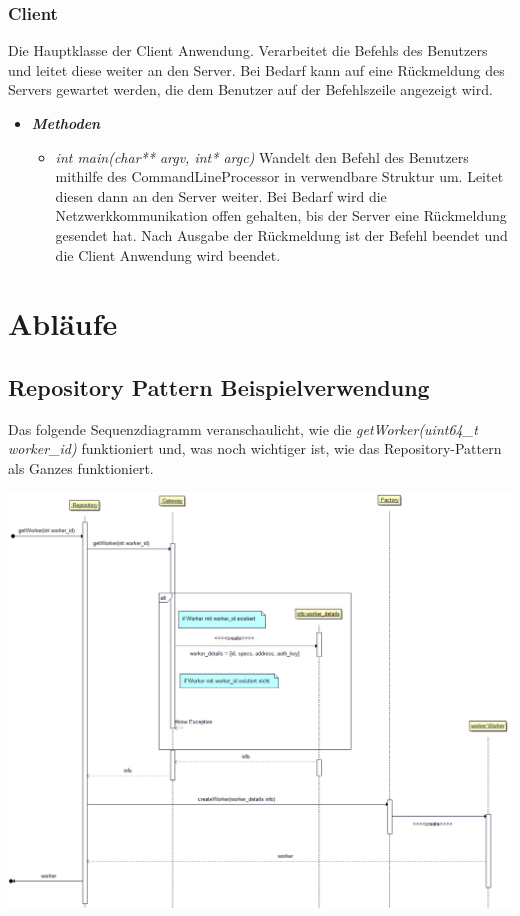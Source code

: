 \documentclass[a4paper,12pt]{article}
\begin{document}
\subsubsection{Client}

Die Hauptklasse der Client Anwendung. Verarbeitet die Befehls des Benutzers und leitet diese weiter an den Server. Bei Bedarf kann auf eine Rückmeldung des Servers gewartet werden, die dem Benutzer auf der Befehlszeile angezeigt wird.

\begin{itemize}[label={}]

	\item \textit{\textbf{Methoden}}
		\begin{itemize}[label={\textbullet}]

			\item \textit{int main(char** argv, int* argc)} Wandelt den Befehl des Benutzers mithilfe des CommandLineProcessor in verwendbare Struktur um. Leitet diesen dann an den Server weiter. Bei Bedarf wird die Netzwerkkommunikation offen gehalten, bis der Server eine Rückmeldung gesendet hat. Nach Ausgabe der Rückmeldung ist der Befehl beendet und die Client Anwendung wird beendet.
			
		\end{itemize}

\end{itemize}

\clearpage
\section{Abläufe}
\subsection{Repository Pattern Beispielverwendung}

Das folgende Sequenzdiagramm veranschaulicht, wie die \textit{getWorker(uint64\_t worker\_id)} funktioniert und, was noch wichtiger ist, wie das Repository-Pattern als Ganzes funktioniert.

\includegraphics[width=\textwidth]{repository_sequence_diagram}
\end{document}
